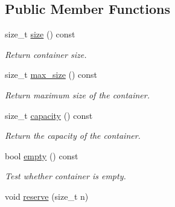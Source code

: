 \subsection*{Public Member Functions}
\begin{DoxyCompactItemize}
\item 
size\+\_\+t \hyperlink{classmerlin_1_1set_ac0742e3c7efa8729e1665dc4d0e27784}{size} () const \hypertarget{classmerlin_1_1set_ac0742e3c7efa8729e1665dc4d0e27784}{}\label{classmerlin_1_1set_ac0742e3c7efa8729e1665dc4d0e27784}

\begin{DoxyCompactList}\small\item\em Return container size. \end{DoxyCompactList}\item 
size\+\_\+t \hyperlink{classmerlin_1_1set_ad67b073f6e622b4172d45b94bdf8a84a}{max\+\_\+size} () const \hypertarget{classmerlin_1_1set_ad67b073f6e622b4172d45b94bdf8a84a}{}\label{classmerlin_1_1set_ad67b073f6e622b4172d45b94bdf8a84a}

\begin{DoxyCompactList}\small\item\em Return maximum size of the container. \end{DoxyCompactList}\item 
size\+\_\+t \hyperlink{classmerlin_1_1set_ad3f6a7acc4c9bf242f7f7232e50327bc}{capacity} () const \hypertarget{classmerlin_1_1set_ad3f6a7acc4c9bf242f7f7232e50327bc}{}\label{classmerlin_1_1set_ad3f6a7acc4c9bf242f7f7232e50327bc}

\begin{DoxyCompactList}\small\item\em Return the capacity of the container. \end{DoxyCompactList}\item 
bool \hyperlink{classmerlin_1_1set_a8b606658f0bd7e5b75678110916a3e4a}{empty} () const \hypertarget{classmerlin_1_1set_a8b606658f0bd7e5b75678110916a3e4a}{}\label{classmerlin_1_1set_a8b606658f0bd7e5b75678110916a3e4a}

\begin{DoxyCompactList}\small\item\em Test whether container is empty. \end{DoxyCompactList}\item 
void \hyperlink{classmerlin_1_1set_a320b79b019b9eb53317443c44c92d5a5}{reserve} (size\+\_\+t n)\hypertarget{classmerlin_1_1set_a320b79b019b9eb53317443c44c92d5a5}{}\label{classmerlin_1_1set_a320b79b019b9eb53317443c44c92d5a5}


\end{DoxyCompactItemize}
